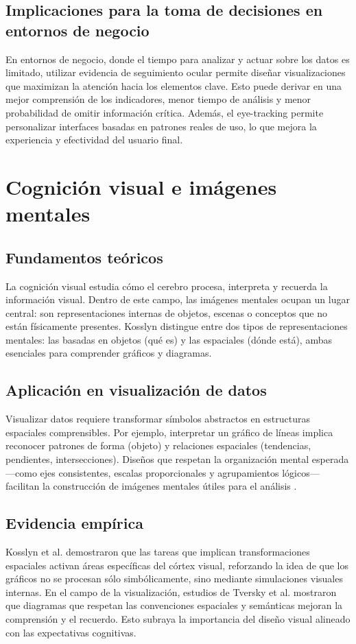 \documentclass[12pt]{article}
\begin{document}
\subsection{Implicaciones para la toma de decisiones en entornos de negocio}
En entornos de negocio, donde el tiempo para analizar y actuar sobre los datos es limitado, utilizar evidencia de seguimiento ocular permite diseñar visualizaciones que maximizan la atención hacia los elementos clave. Esto puede derivar en una mejor comprensión de los indicadores, menor tiempo de análisis y menor probabilidad de omitir información crítica. Además, el eye-tracking permite personalizar interfaces basadas en patrones reales de uso, lo que mejora la experiencia y efectividad del usuario final.


\section{Cognición visual e imágenes mentales}

\subsection{Fundamentos teóricos}
La cognición visual estudia cómo el cerebro procesa, interpreta y recuerda la información visual. Dentro de este campo, las imágenes mentales ocupan un lugar central: son representaciones internas de objetos, escenas o conceptos que no están físicamente presentes. Kosslyn \parencite{kosslyn1994} distingue entre dos tipos de representaciones mentales: las basadas en objetos (qué es) y las espaciales (dónde está), ambas esenciales para comprender gráficos y diagramas.

\subsection{Aplicación en visualización de datos}
Visualizar datos requiere transformar símbolos abstractos en estructuras espaciales comprensibles. Por ejemplo, interpretar un gráfico de líneas implica reconocer patrones de forma (objeto) y relaciones espaciales (tendencias, pendientes, intersecciones). Diseños que respetan la organización mental esperada —como ejes consistentes, escalas proporcionales y agrupamientos lógicos— facilitan la construcción de imágenes mentales útiles para el análisis \parencite{cleveland1984}.

\subsection{Evidencia empírica}
Kosslyn et al. \parencite{kosslyn2006} demostraron que las tareas que implican transformaciones espaciales activan áreas específicas del córtex visual, reforzando la idea de que los gráficos no se procesan sólo simbólicamente, sino mediante simulaciones visuales internas. En el campo de la visualización, estudios de Tversky et al. \parencite{tversky2002} mostraron que diagramas que respetan las convenciones espaciales y semánticas mejoran la comprensión y el recuerdo. Esto subraya la importancia del diseño visual alineado con las expectativas cognitivas.
\end{document}
